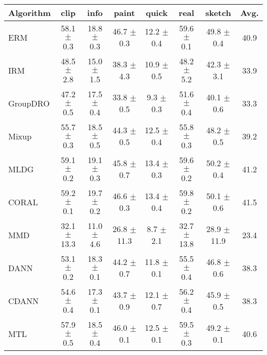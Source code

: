 \begin{table*}
\begin{center}
\begin{tabular}{lccccccc}
\toprule
\textbf{Algorithm}   & \textbf{clip}        & \textbf{info}        & \textbf{paint}       & \textbf{quick}       & \textbf{real}        & \textbf{sketch}      & \textbf{Avg.}         \\
\midrule
ERM                  & 58.1 $\pm$ 0.3       & 18.8 $\pm$ 0.3       & 46.7 $\pm$ 0.3       & 12.2 $\pm$ 0.4       & 59.6 $\pm$ 0.1       & 49.8 $\pm$ 0.4       & 40.9                 \\
IRM                  & 48.5 $\pm$ 2.8       & 15.0 $\pm$ 1.5       & 38.3 $\pm$ 4.3       & 10.9 $\pm$ 0.5       & 48.2 $\pm$ 5.2       & 42.3 $\pm$ 3.1       & 33.9                 \\
GroupDRO             & 47.2 $\pm$ 0.5       & 17.5 $\pm$ 0.4       & 33.8 $\pm$ 0.5       & 9.3 $\pm$ 0.3        & 51.6 $\pm$ 0.4       & 40.1 $\pm$ 0.6       & 33.3                 \\
Mixup                & 55.7 $\pm$ 0.3       & 18.5 $\pm$ 0.5       & 44.3 $\pm$ 0.5       & 12.5 $\pm$ 0.4       & 55.8 $\pm$ 0.3       & 48.2 $\pm$ 0.5       & 39.2                 \\
MLDG                 & 59.1 $\pm$ 0.2       & 19.1 $\pm$ 0.3       & 45.8 $\pm$ 0.7       & 13.4 $\pm$ 0.3       & 59.6 $\pm$ 0.2       & 50.2 $\pm$ 0.4       & 41.2                 \\
CORAL                & 59.2 $\pm$ 0.1       & 19.7 $\pm$ 0.2       & 46.6 $\pm$ 0.3       & 13.4 $\pm$ 0.4       & 59.8 $\pm$ 0.2       & 50.1 $\pm$ 0.6       & 41.5                 \\
MMD                  & 32.1 $\pm$ 13.3      & 11.0 $\pm$ 4.6       & 26.8 $\pm$ 11.3      & 8.7 $\pm$ 2.1        & 32.7 $\pm$ 13.8      & 28.9 $\pm$ 11.9      & 23.4                 \\
DANN                 & 53.1 $\pm$ 0.2       & 18.3 $\pm$ 0.1       & 44.2 $\pm$ 0.7       & 11.8 $\pm$ 0.1       & 55.5 $\pm$ 0.4       & 46.8 $\pm$ 0.6       & 38.3                 \\
CDANN                & 54.6 $\pm$ 0.4       & 17.3 $\pm$ 0.1       & 43.7 $\pm$ 0.9       & 12.1 $\pm$ 0.7       & 56.2 $\pm$ 0.4       & 45.9 $\pm$ 0.5       & 38.3                 \\
MTL                  & 57.9 $\pm$ 0.5       & 18.5 $\pm$ 0.4       & 46.0 $\pm$ 0.1       & 12.5 $\pm$ 0.1       & 59.5 $\pm$ 0.3       & 49.2 $\pm$ 0.1       & 40.6                 \\

\end{tabular}
\end{center}
\end{table*}
